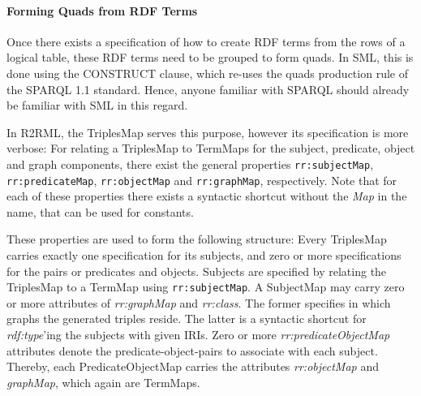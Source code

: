 \paragraph{Forming Quads from RDF Terms}
Once there exists a specification of how to create RDF terms from the rows of a
logical table, these RDF terms need to be grouped to form quads.
In SML, this is done using the CONSTRUCT clause, which re-uses the quads
production rule of the SPARQL 1.1 standard.
Hence, anyone familiar with SPARQL should already be familiar with SML in this regard.

In R2RML, the TriplesMap serves this purpose, however its specification is more
verbose:
For relating a TriplesMap to TermMaps for the subject, predicate, object and
graph components, there exist the general properties \texttt{rr:subjectMap},
\texttt{rr:predicateMap}, \texttt{rr:objectMap} and \texttt{rr:graphMap},
respectively.
Note that for each of these properties there exists a syntactic
shortcut without the \emph{Map} in the name, that can be used for constants.



These properties are used to form the following structure:
Every TriplesMap carries exactly one specification for its subjects, and zero or
more specifications for the pairs or predicates and objects.
Subjects are specified by relating the TriplesMap to a TermMap
using \texttt{rr:subjectMap}.
A SubjectMap may carry zero or more attributes of \emph{rr:graphMap} and \emph{rr:class}.
The former specifies in which graphs the generated triples reside.
The latter is a syntactic shortcut for \emph{rdf:type}'ing the subjects with
given IRIs.
Zero or more \emph{rr:predicateObjectMap} attributes denote the
predicate-object-pairs to associate with each subject.
Thereby, each PredicateObjectMap carries the attributes \emph{rr:objectMap} and
\emph{graphMap}, which again are TermMaps.







